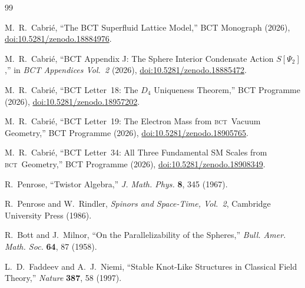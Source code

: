 \documentclass[aps,prl,twocolumn,superscriptaddress,floatfix]{revtex4-2}
\newcommand{\BCT}{\textsc{bct}}
\begin{document}
\begin{thebibliography}{99}

M.~R.~Cabri\'{e},
``The BCT Superfluid Lattice Model,''
BCT Monograph (2026),
\href{https://doi.org/10.5281/zenodo.18884976}{doi:10.5281/zenodo.18884976}.

M.~R.~Cabri\'{e},
``BCT Appendix J: The Sphere Interior Condensate Action $S[\Psi_2]$,''
in \textit{BCT Appendices Vol.~2} (2026),
\href{https://doi.org/10.5281/zenodo.18885472}{doi:10.5281/zenodo.18885472}.

M.~R.~Cabri\'{e},
``BCT Letter~18: The $D_4$ Uniqueness Theorem,''
BCT Programme (2026),
\href{https://doi.org/10.5281/zenodo.18957202}{doi:10.5281/zenodo.18957202}.

M.~R.~Cabri\'{e},
``BCT Letter~19: The Electron Mass from \BCT\ Vacuum Geometry,''
BCT Programme (2026),
\href{https://doi.org/10.5281/zenodo.18905765}{doi:10.5281/zenodo.18905765}.

M.~R.~Cabri\'{e},
``BCT Letter~34: All Three Fundamental SM Scales from \BCT\ Geometry,''
BCT Programme (2026),
\href{https://doi.org/10.5281/zenodo.18908349}{doi:10.5281/zenodo.18908349}.

R.~Penrose,
``Twistor Algebra,''
\textit{J. Math. Phys.} \textbf{8}, 345 (1967).

R.~Penrose and W.~Rindler,
\textit{Spinors and Space-Time, Vol.~2},
Cambridge University Press (1986).

R.~Bott and J.~Milnor,
``On the Parallelizability of the Spheres,''
\textit{Bull. Amer. Math. Soc.} \textbf{64}, 87 (1958).

L.~D.~Faddeev and A.~J.~Niemi,
``Stable Knot-Like Structures in Classical Field Theory,''
\textit{Nature} \textbf{387}, 58 (1997).

\end{thebibliography}
\end{document}
